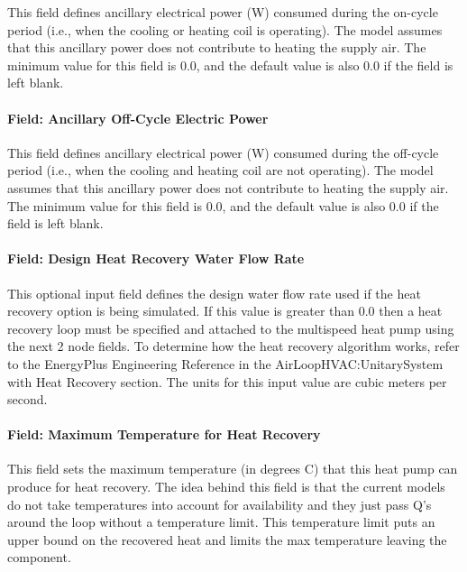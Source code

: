 This field defines ancillary electrical power (W) consumed during the on-cycle period (i.e., when the cooling or heating coil is operating). The model assumes that this ancillary power does not contribute to heating the supply air. The minimum value for this field is 0.0, and the default value is also 0.0 if the field is left blank.

\paragraph{Field: Ancillary Off-Cycle Electric Power}\label{field-ancillary-off-cycle-electric-power}

This field defines ancillary electrical power (W) consumed during the off-cycle period (i.e., when the cooling and heating coil are not operating). The model assumes that this ancillary power does not contribute to heating the supply air. The minimum value for this field is 0.0, and the default value is also 0.0 if the field is left blank.

\paragraph{Field: Design Heat Recovery Water Flow Rate}\label{field-design-heat-recovery-water-flow-rate-001}

This optional input field defines the design water flow rate used if the heat recovery option is being simulated. If this value is greater than 0.0 then a heat recovery loop must be specified and attached to the multispeed heat pump using the next 2 node fields. To determine how the heat recovery algorithm works, refer to the EnergyPlus Engineering Reference in the AirLoopHVAC:UnitarySystem with Heat Recovery section. The units for this input value are cubic meters per second.

\paragraph{Field: Maximum Temperature for Heat Recovery}\label{field-maximum-temperature-for-heat-recovery}

This field sets the maximum temperature (in degrees C) that this heat pump can produce for heat recovery. The idea behind this field is that the current models do not take temperatures into account for availability and they just pass Q's around the loop without a temperature limit. This temperature limit puts an upper bound on the recovered heat and limits the max temperature leaving the component.


